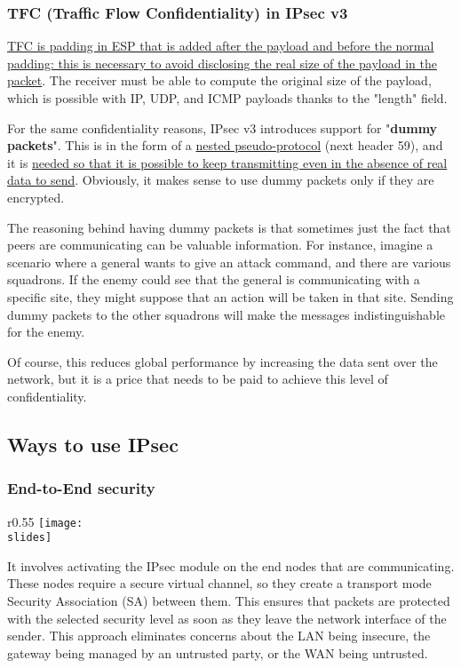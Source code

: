 \subsubsection{TFC (Traffic Flow Confidentiality) in IPsec v3}
\ul{TFC is padding in ESP that is added after the payload and before the normal padding: this is necessary to avoid disclosing the real size of the payload in the packet}. The receiver must be able to compute the original size of the payload, which is possible with IP, UDP, and ICMP payloads thanks to the "length" field.

For the same confidentiality reasons, IPsec v3 introduces support for "\textbf{dummy packets}". This is in the form of a \underline{nested pseudo-protocol} (next header 59), and it is \ul{needed so that it is possible to keep transmitting even in the absence of real data to send}. Obviously, it makes sense to use dummy packets only if they are encrypted.

The reasoning behind having dummy packets is that sometimes just the fact that peers are communicating can be valuable information. For instance, imagine a scenario where a general wants to give an attack command, and there are various squadrons. If the enemy could see that the general is communicating with a specific site, they might suppose that an action will be taken in that site. Sending dummy packets to the other squadrons will make the messages indistinguishable for the enemy.

Of course, this reduces global performance by increasing the data sent over the network, but it is a price that needs to be paid to achieve this level of confidentiality.


\subsection{Ways to use IPsec}
\subsubsection{End-to-End security}
\begin{wrapfigure}{r}{0.55\textwidth}
    \centering
    \texttt{[image: \\slides]}
\end{wrapfigure}
It involves activating the IPsec module on the end nodes that are communicating. These nodes require a secure virtual channel, so they create a transport mode Security Association (SA) between them. This ensures that packets are protected with the selected security level as soon as they leave the network interface of the sender. This approach eliminates concerns about the LAN being insecure, the gateway being managed by an untrusted party, or the WAN being untrusted.

